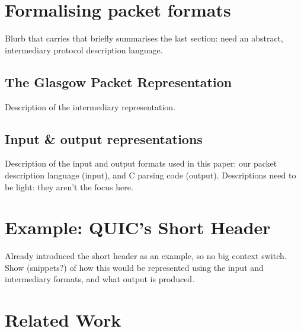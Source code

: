 \documentclass[10pt,sigconf]{acmart}
\begin{document}
\section{Formalising packet formats}
\label{sec:formalising}

Blurb that carries that briefly summarises the last section: need an abstract,
intermediary protocol description language. 

\subsection{The Glasgow Packet Representation}

Description of the intermediary representation.

\subsection{Input \& output representations}

Description of the input and output formats used in this paper: our packet description
language (input), and C parsing code (output). Descriptions need to be light: they aren't
the focus here. 

\section{Example: QUIC's Short Header}
\label{sec:casestudy}

Already introduced the short header as an example, so no big context switch. Show
(snippets?) of how this would be represented using the input and intermediary formats, and
what output is produced.

\section{Related Work}
\label{sec:related}

%
% 
\end{document}
